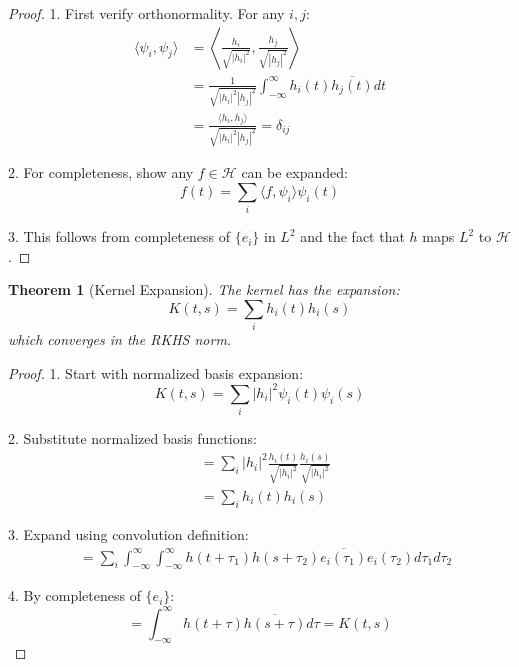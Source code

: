 \documentclass{article}
\newtheorem{theorem}{Theorem}
\begin{document}
\begin{proof}
1. First verify orthonormality. For any $i,j$:
\begin{align*}
    \langle \psi_i, \psi_j \rangle &= \left\langle \frac{h_i}{\sqrt{|h_i|^2}}, \frac{h_j}{\sqrt{|h_j|^2}} \right\rangle \\
    &= \frac{1}{\sqrt{|h_i|^2|h_j|^2}} \int_{-\infty}^{\infty} h_i(t)\overline{h_j(t)}dt \\
    &= \frac{\langle h_i, h_j \rangle}{\sqrt{|h_i|^2|h_j|^2}} = \delta_{ij}
\end{align*}

2. For completeness, show any $f \in \mathcal{H}$ can be expanded:
\begin{equation*}
    f(t) = \sum_i \langle f, \psi_i \rangle \psi_i(t)
\end{equation*}

3. This follows from completeness of $\{e_i\}$ in $L^2$ and the fact that $h$ maps $L^2$ to $\mathcal{H}$.
\end{proof}

\begin{theorem}[Kernel Expansion]
The kernel has the expansion:
\begin{equation}
    K(t,s) = \sum_i h_i(t)h_i(s)
\end{equation}
which converges in the RKHS norm.
\end{theorem}

\begin{proof}
1. Start with normalized basis expansion:
\begin{equation*}
    K(t,s) = \sum_i |h_i|^2 \psi_i(t)\psi_i(s)
\end{equation*}

2. Substitute normalized basis functions:
\begin{align*}
    &= \sum_i |h_i|^2 \frac{h_i(t)}{\sqrt{|h_i|^2}} \frac{h_i(s)}{\sqrt{|h_i|^2}} \\
    &= \sum_i h_i(t)h_i(s)
\end{align*}

3. Expand using convolution definition:
\begin{align*}
    &= \sum_i \int_{-\infty}^{\infty}\int_{-\infty}^{\infty} h(t+\tau_1)h(s+\tau_2)\overline{e_i(\tau_1)}e_i(\tau_2)d\tau_1d\tau_2
\end{align*}

4. By completeness of $\{e_i\}$:
\begin{equation*}
    = \int_{-\infty}^{\infty} h(t+\tau)\overline{h(s+\tau)}d\tau = K(t,s)
\end{equation*}
\end{proof}
\end{document}
